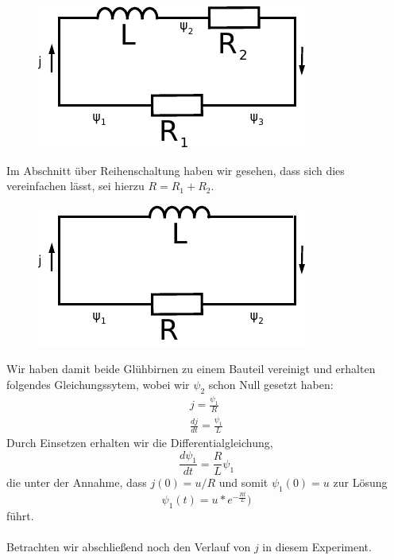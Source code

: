 \documentclass[11pt,a4paper,leqno]{report}
\numberwithin{equation}{chapter}
\begin{document}
  \begin{figure}[H]
	\begin{center}
		\includegraphics[scale=1]{Bilder/spuledir2.pdf}
	\end{center}
\end{figure}
\noindent
Im Abschnitt \"uber Reihenschaltung haben wir gesehen, dass sich dies vereinfachen l\"asst, sei hierzu $R = R_1 + R_2$.
  \begin{figure}[H]
	\begin{center}
		\includegraphics[scale=1]{Bilder/spuledir3.pdf}
	\end{center}
\end{figure}
\noindent
Wir haben damit beide Gl\"uhbirnen zu einem Bauteil vereinigt und erhalten folgendes Gleichungssytem, wobei wir $\psi_2$ schon Null gesetzt haben:
 \begin{align} 
j = \frac{\psi_1}{R}\\
\frac{dj}{dt} = \frac{\psi_1}{L}
\end{align}
Durch Einsetzen erhalten wir die Differentialgleichung,
\begin{equation}
\frac{d\psi_1}{dt} = \frac{R}{L}\psi_1
\end{equation}  
die unter der Annahme, dass $j(0) = u/R$ und somit $\psi_1(0)=u$ zur L\"osung
\begin{equation*}
\psi_1(t) = u * e^{-\frac{R t}{L}})
\end{equation*}  
f\"uhrt.\\
\\
Betrachten wir abschlie\ss{}end noch den Verlauf von $j$ in diesem Experiment.
\end{document}
